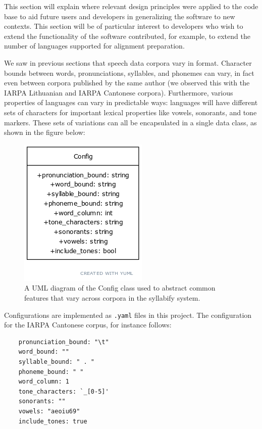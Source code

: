 \documentclass[11pt]{article}
\begin{document}
This section will explain where relevant design principles were applied to the code base to aid future users and developers in generalizing the software to new contexts. This section will be of particular interest to developers who wish to extend the functionality of the software contributed, for example, to extend the number of languages supported for alignment preparation.

We saw in previous sections that speech data corpora vary in format. Character bounds between words, pronunciations, syllables, and phonemes can vary, in fact even between corpora published by the same author (we observed this with the IARPA Lithuanian and IARPA Cantonese corpora). Furthermore, various properties of languages can vary in predictable ways: languages will have different sets of characters for important lexical properties like vowels, sonorants, and tone markers. These sets of variations can all be encapsulated in a single data class, as shown in the figure below:

\begin{figure}[h]
\centering
\includegraphics[scale=0.5]{config-uml.png}
\caption{A UML diagram of the Config class used to abstract common features that vary across corpora in the syllabify system.}
\label{fig:config-uml}
\end{figure}

Configurations are implemented as \verb|.yaml| files in this project. The configuration for the IARPA Cantonese corpus, for instance follows:

\begin{singlespace}
  \begin{verbatim}
    pronunciation_bound: "\t"
    word_bound: ""
    syllable_bound: " . "
    phoneme_bound: " "
    word_column: 1
    tone_characters: `_[0-5]'
    sonorants: ""
    vowels: "aeoiu69"
    include_tones: true
  \end{verbatim}
\end{singlespace}
\end{document}
